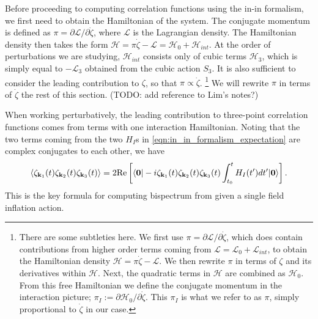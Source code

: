 Before proceeding to computing correlation functions using the in-in formalism, we first need to obtain the Hamiltonian of the system. The conjugate momentum is defined as $\pi = \partial \mathcal{L} / \partial \dot{\zeta}$, where $\mathcal{L}$ is the Lagrangian density. The Hamiltonian density then takes the form $\mathcal{H} = \pi \dot{\zeta} - \mathcal{L} = \mathcal{H}_0 + \mathcal{H}_{int}$. At the order of perturbations we are studying, $\mathcal{H}_{int}$ consists only of cubic terms $\mathcal{H}_3$, which is simply equal to $-\mathcal{L}_3$ obtained from the cubic action $S_3$. It is also sufficient to consider the leading contribution to $\zeta$, so that $\pi \propto \dot{\zeta}$.
\footnote{There are some subtleties here. We first use $\pi = \partial \mathcal{L} / \partial \dot{\zeta}$, which does contain contributions from higher order terms coming from $\mathcal{L}=\mathcal{L}_0 + \mathcal{L}_{int}$, to obtain the Hamiltonian density $\mathcal{H} = \pi \dot{\zeta} - \mathcal{L}$. We then rewrite $\pi$ in terms of $\zeta$ and its derivatives within $\mathcal{H}$. Next, the quadratic terms in $\mathcal{H}$ are combined as $\mathcal{H}_0$. From this free Hamiltonian we define the conjugate momentum in the interaction picture; $\pi_I :=  \partial \mathcal{H}_0 / \partial \dot{\zeta}$. This $\pi_I$ is what we refer to as $\pi$, simply proportional to $\dot{\zeta}$ in our case.}
We will rewrite $\pi$ in terms of $\dot{\zeta}$ the rest of this section. (TODO: add reference to Lim's notes?)

When working perturbatively, the leading contribution to three-point correlation functions comes from terms with one interaction Hamiltonian. Noting that the two terms coming from the two $H_I$s in \eqref{eqn:in_in_formalism_expectation} are complex conjugates to each other, we have
\begin{align}
	\left< \zeta_{\mathbf{k}_1}(t) \zeta_{\mathbf{k}_2}(t) \zeta_{\mathbf{k}_3}(t) \right> = 2 \text{Re}\left[ \langle\mathbf{0}| -i \zeta_{\mathbf{k}_1}(t) \zeta_{\mathbf{k}_2}(t) \zeta_{\mathbf{k}_3}(t) \int_{t_0}^{t} H_I(t') dt' |\mathbf{0}\rangle \right]. \label{eqn:in_in_formalism_bispectrum}
\end{align}
This is the key formula for computing bispectrum from given a single field inflation action.

